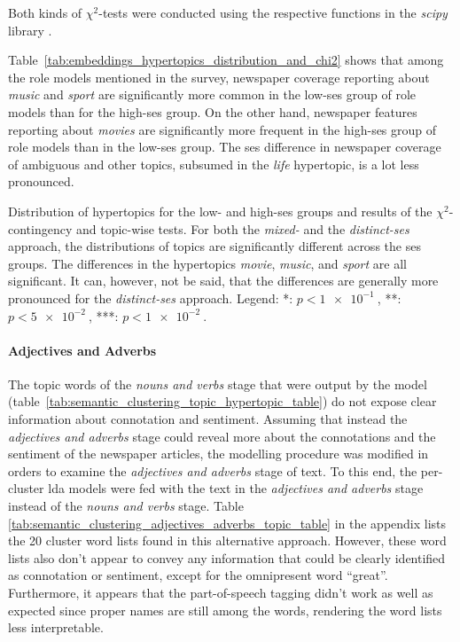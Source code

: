Both kinds of $\chi^2$-tests were conducted using the respective functions in the \textit{scipy} library \autocite{scipychi2_scipy_nodate,scipychi2_contingency_scipy_nodate}.

Table~\ref{tab:embeddings_hypertopics_distribution_and_chi2} shows that among the role models mentioned in the survey, newspaper coverage reporting about \textit{music} and \textit{sport} are significantly more common in the low-\gls{ses} group of role models than for the high-\gls{ses} group. On the other hand, newspaper features reporting about \textit{movies} are significantly more frequent in the high-\gls{ses} group of role models than in the low-\gls{ses} group. The \gls{ses} difference in newspaper coverage of ambiguous and other topics, subsumed in the \textit{life} hypertopic, is a lot less pronounced.

\begin{table}
    \centering
    
    \caption{Distribution of hypertopics for the low- and high-\gls{ses} groups and results of the $\chi^2$-contingency and topic-wise tests. For both the \textit{mixed-} and the \textit{distinct-\gls{ses}} approach, the distributions of topics are significantly different across the \gls{ses} groups. The differences in the hypertopics \textit{movie}, \textit{music}, and \textit{sport} are all significant. It can, however, not be said, that the differences are generally more pronounced for the \textit{distinct-\gls{ses}} approach. Legend: *: $p < \SI{1e-1}{}$, **: $p<\SI{5e-2}{}$, ***: $p<\SI{1e-2}{}$.}\label{tab:embeddings_hypertopics_distribution_and_chi2}
\end{table}

\paragraph{Adjectives and Adverbs}
The topic words of the \textit{nouns and verbs} stage that were output by the model (table~\ref{tab:semantic_clustering_topic_hypertopic_table}) do not expose clear information about connotation and sentiment. Assuming that instead the \textit{adjectives and adverbs} stage could reveal more about the connotations and the sentiment of the newspaper articles, the modelling procedure was modified in orders to examine the \textit{adjectives and adverbs} stage of text. To this end, the per-cluster \gls{lda} models were fed with the text in the \textit{adjectives and adverbs} stage instead of the \textit{nouns and verbs} stage. Table \ref{tab:semantic_clustering_adjectives_adverbs_topic_table} in the appendix lists the \SI{20}{} cluster word lists found in this alternative approach. However, these word lists also don't appear to convey any information that could be clearly identified as connotation or sentiment, except for the omnipresent word ``great''. Furthermore, it appears that the part-of-speech tagging didn't work as well as expected since proper names are still among the words, rendering the word lists less interpretable.


